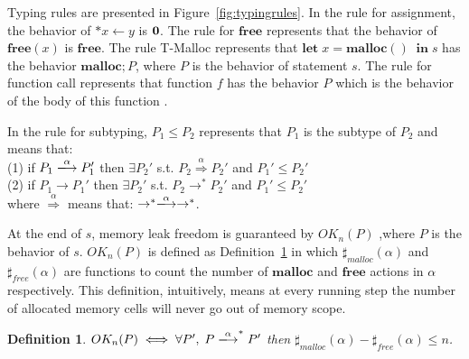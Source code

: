\documentclass[english]{jssst_ppl} %
\newcommand\LET{\mathbf{let}\;}
\newcommand\IN{\mathbf{in}\;}
\newcommand\MALLOC{\mathbf{malloc()}\;}
\newcommand\Malloc{\mathbf{malloc}}
\newcommand\Free{\mathbf{free}}
\newcommand\Cirx{(x)}
\newtheorem{myDef}{Definition}
\theoremstyle{definition}
\begin{document}
Typing rules are presented in Figure~\ref{fig:typingrules}. In the rule for assignment, the behavior of  $*x \leftarrow y$ is $\bf 0$. The rule for $\Free$ represents that the behavior of $\Free \Cirx$ is $\Free$. The rule T-Malloc represents that $\LET x = \MALLOC \; \IN s$ has the behavior $\Malloc;P$, where $P$ is the behavior of statement $s$. The rule for function call represents that function $f$ has the behavior $P$ which is the behavior of the body of this function .

In the rule for subtyping, $P_{1} \le P_{2}$ represents that $P_{1}$ is the subtype of $P_{2}$ and  means that: \\
(1) if $P_{1} \xlongrightarrow{\alpha}  P_{1}'$ then $\exists P_{2}' $ s.t. $P_{2} \overset{\text{$\alpha$}}{\Longrightarrow} P_{2}'$ and $ P_{1}' \le P_{2}' $\\
(2) if $P_{1} \rightarrow P_{1}'$ then $\exists P_{2}'$ s.t. $P_{2} \rightarrow^{*} P_{2}'$ and  $P_{1}' \le P_{2}'$\\
where $\overset{\text{$\alpha$}}{\Longrightarrow}$ means that: $\rightarrow^{*} \xlongrightarrow{\alpha} \rightarrow^{*}$.

At the end of $s$, memory leak freedom is guaranteed by $OK_{n}(P)$ ,where $P$ is the behavior of $s$. $OK_{n}(P)$ is defined as Definition~\ref{df:okn} in which $\sharp_{malloc}(\alpha)$ and $\sharp_{free}(\alpha)$ are functions to count the number of $\Malloc$ and $\Free$ actions in $\alpha$ respectively. This definition, intuitively, means at every running step the number of allocated memory cells will never go out of memory scope.
\begin{myDef}
  $OK_{n}(P) \iff \forall P',\; P \xlongrightarrow{\alpha}^{*}P'$ then $\sharp_{malloc}(\alpha)-\sharp_{free}(\alpha)\le n$.
\label{df:okn}
\end{myDef}
\end{document}

